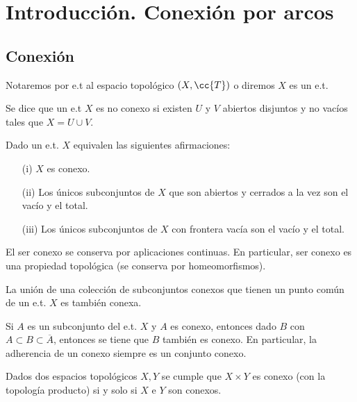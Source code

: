 \chapter*{Introducción. Conexión por arcos}

\section{Conexión}

\begin{notacion}
    Notaremos por e.t al espacio topológico $(X,\cc{T})$ o diremos $X$ es un e.t.
\end{notacion}

\begin{definicion}
    Se dice que un e.t $X$ es {no} conexo si existen $U$ y $V$ abiertos disjuntos y no vacíos tales que $X=U\cup V$. 
\end{definicion}

\begin{prop}
    Dado un e.t. $X$ equivalen las siguientes afirmaciones:
    \begin{enumerate}
        \item[(i)] $X$ es conexo.
        \item[(ii)] Los únicos subconjuntos de $X$ que son abiertos y cerrados a la vez son el vacío y el total. 
        \item[(iii)] Los únicos subconjuntos de $X$ con frontera vacía son el vacío y el total. 
    \end{enumerate}
\end{prop}

\begin{teo}
    El ser conexo se conserva por aplicaciones continuas. En particular, ser conexo es una propiedad topológica (se conserva por homeomorfismos).
\end{teo}

\begin{teo}
    La unión de una colección de subconjuntos conexos que tienen un punto común de un e.t. $X$ es también conexa.
\end{teo}

\begin{teo}
    Si $A$ es un subconjunto del e.t. $X$ y $A$ es conexo, entonces dado $B$ con $A\subset B\subset\overline{A}$, entonces se tiene que $B$ también es conexo. En particular, la adherencia de un conexo siempre es un conjunto conexo.
\end{teo}

\begin{teo}
    Dados dos espacios topológicos $X,Y$ se cumple que $X\times Y$ es conexo (con la topología producto) si y solo si $X$ e $Y$ son conexos.
\end{teo}


